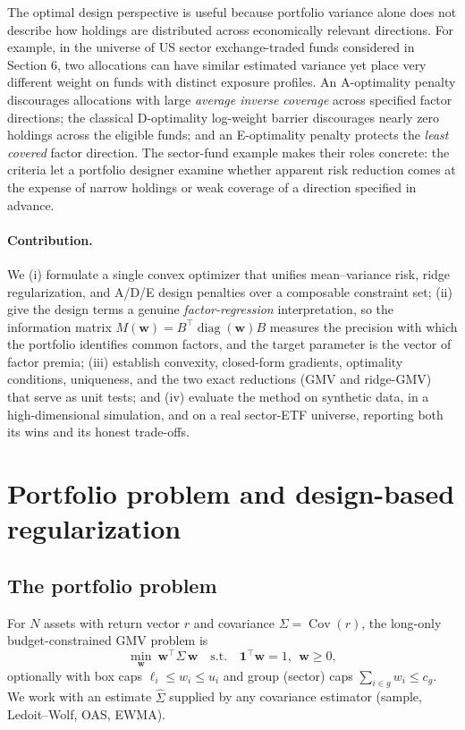 \documentclass[11pt]{article}
\newcommand{\Sig}{\Sigma}
\newcommand{\Sighat}{\hat\Sigma}
\newcommand{\diag}{\operatorname{diag}}
\newcommand{\one}{\mathbf{1}}
\newcommand{\w}{\mathbf{w}}
\newcommand{\M}{M(\w)}
\begin{document}
The optimal design perspective is useful because portfolio variance alone does not describe how holdings are distributed across economically relevant directions. For example, in the universe of US sector exchange-traded funds considered in Section 6, two allocations can have similar estimated variance yet place very different weight on funds with distinct exposure profiles. An A-optimality penalty discourages allocations with large \emph{average inverse coverage} across specified factor directions; the classical D-optimality log-weight barrier discourages nearly zero holdings across the eligible funds; and an E-optimality penalty protects the \emph{least covered} factor direction. 
The sector-fund example makes their roles concrete: the criteria let a portfolio designer examine whether apparent risk reduction comes at the expense of narrow holdings or weak coverage of a direction specified in advance.

\paragraph{Contribution.} We (i) formulate a single convex optimizer that unifies
mean--variance risk, ridge regularization, and A/D/E design penalties over a
composable constraint set; (ii) give the design terms a genuine
\emph{factor-regression} interpretation, so the information matrix
$\M=B^\top\diag(\w)B$ measures the precision with which the portfolio identifies
common factors, and the target parameter is the vector of factor premia;
(iii) establish convexity, closed-form gradients, optimality conditions, uniqueness, and
the two exact reductions (GMV and ridge-GMV) that serve as unit tests; and
(iv) evaluate the method on synthetic data, in a high-dimensional simulation, and
on a real sector-ETF universe, reporting both its wins and its honest
trade-offs.

\section{Portfolio problem and design-based regularization}
\subsection{The portfolio problem}
For $N$ assets with return vector $r$ and covariance $\Sig=\operatorname{Cov}(r)$,
the long-only budget-constrained GMV problem is
\[
  \min_{\w}\ \w^\top\Sig\,\w
  \quad\text{s.t.}\quad \one^\top\w=1,\ \ \w\ge0,
\]
optionally with box caps $\ell_i\le w_i\le u_i$ and group (sector) caps
$\sum_{i\in g}w_i\le c_g$. We work with an estimate $\Sighat$ supplied by any
covariance estimator (sample, Ledoit--Wolf, OAS, EWMA).
\end{document}
